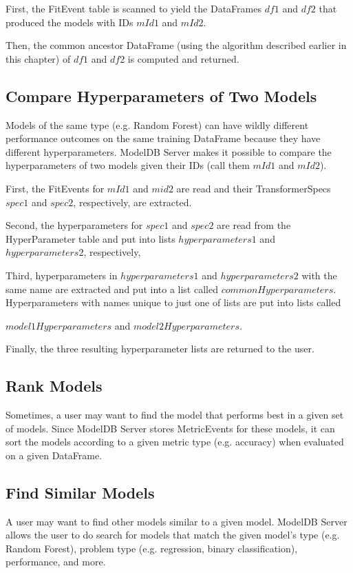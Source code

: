 First, the FitEvent table is scanned to yield the DataFrames $df1$ and $df2$
that produced the models with IDs $mId1$ and $mId2$.

Then, the common ancestor DataFrame (using the algorithm described earlier in
this chapter) of $df1$ and $df2$ is computed and returned.

\subsection{Compare Hyperparameters of Two Models}
Models of the same type (e.g. Random Forest) can have wildly different performance
outcomes on the same training DataFrame because they have different hyperparameters.
ModelDB Server makes it possible to compare the hyperparameters of two models given their
IDs (call them $mId1$ and $mId2$).

First, the FitEvents for $mId1$ and $mid2$ are read and their TransformerSpecs $spec1$ and
$spec2$, respectively, are extracted.

Second, the hyperparameters for $spec1$ and $spec2$ are read from the HyperParameter table
and put into lists $hyperparameters1$ and $hyperparameters2$, respectively,

Third, hyperparameters in $hyperparameters1$ and $hyperparameters2$ with the same name are
extracted and put into a list called $commonHyperparameters$. Hyperparameters with names unique to just
one of lists are put into lists called 

$model1Hyperparameters$ and $model2Hyperparameters$.

Finally, the three resulting hyperparameter lists are
returned to the user.

\subsection{Rank Models}
Sometimes, a user may want to find the model that performs best in a given set of
models. Since ModelDB Server stores MetricEvents for these models, it can sort the models
according to a given metric type (e.g. accuracy) when evaluated on a given DataFrame.

\subsection{Find Similar Models}
A user may want to find other models similar to a given model. ModelDB Server
allows the user to do search for models that match the given model's type (e.g. 
Random Forest), problem type (e.g. regression, binary classification), performance,
and more.

